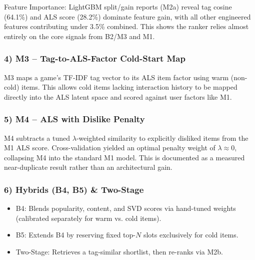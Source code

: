 \documentclass[conference]{IEEEtran}
\begin{document}
Feature Importance: LightGBM split/gain reports (M2a) reveal tag cosine (64.1\%) and ALS score (28.2\%) dominate feature gain, with all other engineered features contributing under 3.5\% combined. This shows the ranker relies almost entirely on the core signals from B2/M3 and M1.

\subsubsection*{4) M3 -- Tag-to-ALS-Factor Cold-Start Map}

M3 maps a game's TF-IDF tag vector to its ALS item factor using warm (non-cold) items. This allows cold items lacking interaction history to be mapped directly into the ALS latent space and scored against user factors like M1.

\subsubsection*{5) M4 -- ALS with Dislike Penalty}

M4 subtracts a tuned $\lambda$-weighted similarity to explicitly disliked items from the M1 ALS score. Cross-validation yielded an optimal penalty weight of $\lambda \approx 0$, collapsing M4 into the standard M1 model. This is documented as a measured near-duplicate result rather than an architectural gain.

\subsubsection*{6) Hybrids (B4, B5) \& Two-Stage}

\begin{itemize}

\item B4: Blends popularity, content, and SVD scores via hand-tuned weights (calibrated separately for warm vs. cold items).

\end{itemize}

\begin{itemize}

\item B5: Extends B4 by reserving fixed top-$N$ slots exclusively for cold items.

\end{itemize}

\begin{itemize}

\item Two-Stage: Retrieves a tag-similar shortlist, then re-ranks via M2b.

\end{itemize}
\end{document}
